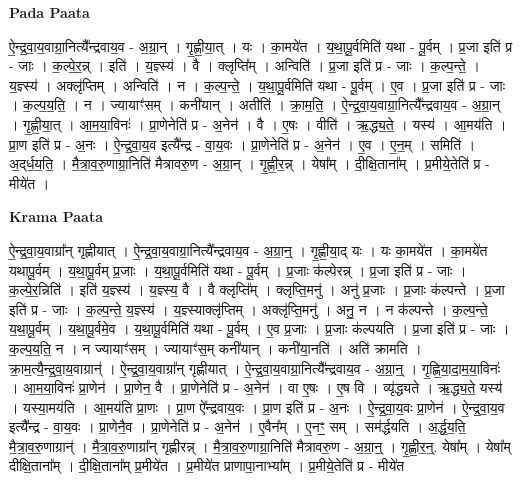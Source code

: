 \documentclass[17pt]{extarticle}
\begin{document}
\textbf{Pada Paata} \newline

ऐ॒न्द्र॒वा॒य॒वाग्रा॒नित्यै᳚न्द्रवाय॒व - अ॒ग्रा॒न् । गृ॒ह्णी॒या॒त् । यः । का॒मये॑त । य॒था॒पू॒र्वमिति॑ यथा - पू॒र्वम् । प्र॒जा इति॑ प्र - जाः । क॒ल्पे॒र॒न्न् । इति॑ । य॒ज्ञ्स्य॑ । वै । क्लृप्ति᳚म् । अन्विति॑ । प्र॒जा इति॑ प्र - जाः । क॒ल्प॒न्ते॒ । य॒ज्ञ्स्य॑ । अक्लृ॑प्तिम् । अन्विति॑ । न । क॒ल्प॒न्ते॒ । य॒था॒पू॒र्वमिति॑ यथा - पू॒र्वम् । ए॒व । प्र॒जा इति॑ प्र - जाः । क॒ल्प॒य॒ति॒ । न । ज्यायाꣳ॑सम् । कनी॑यान् । अतीति॑ । क्रा॒म॒ति॒ । ऐ॒न्द्र॒वा॒य॒वाग्रा॒नित्यै᳚न्द्रवाय॒व - अ॒ग्रा॒न् । गृ॒ह्णी॒या॒त् । आ॒म॒या॒विनः॑ । प्रा॒णेनेति॑ प्र - अ॒नेन॑ । वै । ए॒षः । वीति॑ । ऋ॒द्ध्य॒ते॒ । यस्य॑ । आ॒मय॑ति । प्रा॒ण इति॑ प्र - अ॒नः । ऐ॒न्द्र॒वा॒य॒व इत्यै᳚न्द्र - वा॒य॒वः । प्रा॒णेनेति॑ प्र - अ॒नेन॑ । ए॒व । ए॒न॒म् । समिति॑ । अ॒द्‌र्ध॒य॒ति॒ । मै॒त्रा॒व॒रु॒णाग्रा॒निति॑ मैत्रावरु॒ण - अ॒ग्रा॒न् । गृ॒ह्णी॒र॒न्न् । येषा᳚म् । दी॒क्षि॒ताना᳚म् । प्र॒मीये॒तेति॑ प्र - मीये॑त ।  \newline


\textbf{Krama Paata} \newline

ऐ॒न्द्र॒वा॒य॒वाग्रा᳚न् गृह्णीयात् । ऐ॒न्द्र॒वा॒य॒वाग्रा॒नित्यै᳚न्द्रवाय॒व - अ॒ग्रा॒न्॒ । गृ॒ह्णी॒या॒द् यः । यः का॒मये॑त । का॒मये॑त यथापू॒र्वम् । य॒था॒पू॒र्वम् प्र॒जाः । य॒था॒पू॒र्वमिति॑ यथा - पू॒र्वम् । प्र॒जाः क॑ल्पेरन्न् । प्र॒जा इति॑ प्र - जाः । क॒ल्पे॒र॒न्निति॑ । इति॑ य॒ज्ञ्स्य॑ । य॒ज्ञ्स्य॒ वै । वै क्लृप्ति᳚म् । क्लृप्ति॒मनु॑ । अनु॑ प्र॒जाः । प्र॒जाः क॑ल्पन्ते । प्र॒जा इति॑ प्र - जाः । क॒ल्प॒न्ते॒ य॒ज्ञ्स्य॑ । य॒ज्ञ्स्याक्लृ॑प्तिम् । अक्लृ॑प्ति॒मनु॑ । अनु॒ न । न क॑ल्पन्ते । क॒ल्प॒न्ते॒ य॒था॒पू॒र्वम् । य॒था॒पू॒र्वमे॒व । य॒था॒पू॒र्वमिति॑ यथा - पू॒र्वम् । ए॒व प्र॒जाः । प्र॒जाः क॑ल्पयति । प्र॒जा इति॑ प्र - जाः । क॒ल्प॒य॒ति॒ न । न ज्यायाꣳ॑सम् । ज्यायाꣳ॑स॒म् कनी॑यान् । कनी॑या॒नति॑ । अति॑ क्रामति । क्रा॒म॒त्यै॒न्द्र॒वा॒य॒वाग्रान्॑ । ऐ॒न्द्र॒वा॒य॒वाग्रा᳚न् गृह्णीयात् । ऐ॒न्द्र॒वा॒य॒वाग्रा॒नित्यै᳚न्द्रवाय॒व - अ॒ग्रा॒न्॒ । गृ॒ह्णि॒या॒दा॒म॒या॒विनः॑ । आ॒म॒या॒विनः॑ प्रा॒णेन॑ । प्रा॒णेन॒ वै । प्रा॒णेनेति॑ प्र - अ॒नेन॑ । वा ए॒षः । ए॒ष वि । व्यृ॑द्ध्यते । ऋ॒द्ध्य॒ते॒ यस्य॑ । यस्या॒मय॑ति । आ॒मय॑ति प्रा॒णः । प्रा॒ण ऐ᳚न्द्रवाय॒वः । प्रा॒ण इति॑ प्र - अ॒नः । ऐ॒न्द्र॒वा॒य॒वः प्रा॒णेन॑ । ऐ॒न्द्र॒वा॒य॒व इत्यै᳚न्द्र - वा॒य॒वः । प्रा॒णेनै॒व । प्रा॒णेनेति॑ प्र - अ॒नेन॑ । ए॒वैन᳚म् । ए॒नꣳ॒॒ सम् । सम॑र्द्धयति । अ॒र्द्ध॒य॒ति॒ मै॒त्रा॒व॒रु॒णाग्रान्॑ । मै॒त्रा॒व॒रु॒णाग्रा᳚न् गृह्णीरन्न् । मै॒त्रा॒व॒रु॒णाग्रा॒निति॑ मैत्रावरु॒ण - अ॒ग्रा॒न्॒ । गृ॒ह्णी॒र॒न्॒. येषा᳚म् । येषा᳚म् दीक्षि॒ताना᳚म् । दी॒क्षि॒ताना᳚म् प्र॒मीये॑त । प्र॒मीये॑त प्राणापा॒नाभ्या᳚म् । प्र॒मीये॒तेति॑ प्र - मीये॑त \newline
\end{document}
